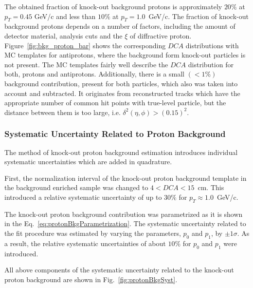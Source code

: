  The obtained fraction of knock-out background protons is approximately $20\%$ at $p_T = 0.45$ GeV/c
 and less than $10\%$ at $p_T = 1.0$~GeV/c. The fraction of knock-out background protons depends on a number of factors, including the amount of detector material, analysis cuts and the $\xi$ of diffractive proton. 
 Figure~\ref{fig:bkg_proton_bar} shows the corresponding $DCA$ distributions with MC templates for antiprotons, where the background form knock-out particles is not present. The MC templates  fairly well describe the $DCA$ distribution for both, protons and antiprotons. Additionally, there is a small $\left(<1\%\right)$ background  contribution, present for both particles, which also was taken into account and subtracted. It originates from reconstructed tracks which have the appropriate number of common hit points with true-level particle, but the distance between them is too large, i.e. $\delta^2\left(\eta,\phi\right)>\left(0.15\right)^2$.
 \captionsetup{format=default,indention=0pt,justification=justified}
 \FloatBarrier
 
 \subsubsection{Systematic Uncertainty Related to Proton Background} 
The method of   knock-out proton background estimation  introduces individual systematic uncertainties which are added in quadrature. 

First, the normalization interval of the  knock-out   proton  background template in the background enriched sample was changed to $4<DCA<15$~cm. This introduced a relative systematic uncertainty of up to $30\%$ for $p_T\approx 1.0$~GeV/c. 

The  knock-out proton background contribution was  parametrized as  it is shown in the Eq.~\ref{eq:protonBkgParametrization}. The systematic uncertainty related to the fit procedure was estimated by varying the   parameters, $p_0$ and $p_1$, by $\pm1\sigma$. As a result, the  relative systematic uncertainties of about $10\%$ for $p_0$ and $p_1$ were introduced.

 All above components of the systematic uncertainty related to the knock-out proton background are shown in Fig.~\ref{fig:protonBkgSyst}.
 

